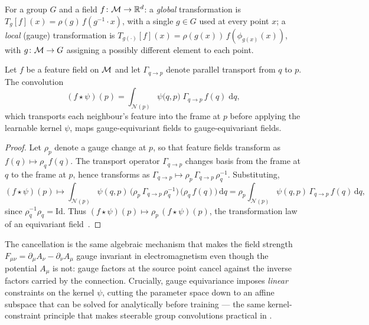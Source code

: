 \begin{definition}
\label{def:gauge:local-global}
For a group $G$ and a field $f\colon \mathcal{M} \to \mathbb{R}^d$:
a \emph{global} transformation is $T_g[f](x) = \rho(g)\, f(g^{-1} \cdot x)$, with
a single $g \in G$ used at every point $x$; a \emph{local} (gauge)
transformation is $T_{g(\cdot)}[f](x) = \rho(g(x))\, f(\phi_{g(x)}(x))$, with
$g\colon \mathcal{M} \to G$ assigning a possibly different element to each point.
\end{definition}

\begin{theorem}
\label{thm:gauge:conv}
Let $f$ be a feature field on $\mathcal{M}$ and let $\Gamma_{q \to p}$ denote parallel
transport from $q$ to $p$. The convolution
\[
  (f \star \psi)(p) = \int_{\mathcal{N}(p)}
    \psi\big(q, p\big)\; \Gamma_{q \to p}\, f(q)\; \mathrm{d}q,
\]
which transports each neighbour's feature into the frame at $p$ before applying
the learnable kernel $\psi$, maps gauge-equivariant fields to
gauge-equivariant fields.
\end{theorem}

\begin{proof}
Let $\rho_p$ denote a gauge change at $p$, so that feature fields transform as
$f(q) \mapsto \rho_q\, f(q)$. The transport operator $\Gamma_{q \to p}$ changes
basis from the frame at $q$ to the frame at $p$, hence transforms as
$\Gamma_{q \to p} \mapsto \rho_p\, \Gamma_{q \to p}\, \rho_q^{-1}$. Substituting,
\[
  (f \star \psi)(p) \mapsto \int_{\mathcal{N}(p)} \psi(q,p)\,
    \big(\rho_p\, \Gamma_{q\to p}\, \rho_q^{-1}\big)\,\big(\rho_q\, f(q)\big)\,
    \mathrm{d}q
  = \rho_p \int_{\mathcal{N}(p)} \psi(q,p)\, \Gamma_{q\to p}\, f(q)\, \mathrm{d}q,
\]
since $\rho_q^{-1}\rho_q = \mathrm{Id}$. Thus $(f \star \psi)(p) \mapsto \rho_p\,
(f \star \psi)(p)$, the transformation law of an equivariant
field~\citep{cohen2019gaugeequivariantconvolutional}.
\end{proof}

The cancellation is the same algebraic mechanism that makes the field strength
$F_{\mu\nu} = \partial_\mu A_\nu - \partial_\nu A_\mu$ gauge invariant in
electromagnetism even though the potential $A_\mu$ is not: gauge factors at the
source point cancel against the inverse factors carried by the connection.
Crucially, gauge equivariance imposes \emph{linear} constraints on the kernel
$\psi$, cutting the parameter space down to an affine subspace that can be solved
for analytically before training --- the same kernel-constraint principle that
makes steerable group convolutions practical in .

